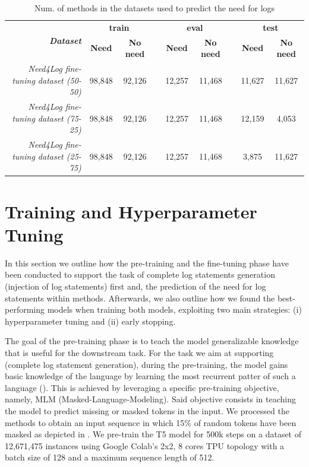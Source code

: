 \begin{table}[h!]
	\centering
	\caption{Num. of methods in the datasets used to predict the need for logs}
	\begin{tabular}{rcccccccc}
		\hline
		\multirow{2}{*}{\textit{\textbf{Dataset}}} & \multicolumn{2}{c}{\textbf{train}} & \textbf{} & \multicolumn{2}{c}{\textbf{eval}}  & \textbf{} & \multicolumn{2}{c}{\textbf{test}}  \\ \cline{2-3} \cline{5-6} \cline{8-9} 
		& \textbf{Need} & \textbf{No need}   & \textbf{} & \textbf{Need} & \textbf{No need}   & \textbf{} & \textbf{Need} & \textbf{No need}   \\ \hline
		\textit{Need4Log fine-tuning dataset (50-50)}         & 98,848        & 92,126             &           & 12,257        & 11,468             &           & 11,627        &  11,627            \\
		\textit{Need4Log fine-tuning dataset (75-25)}         & 98,848        & 92,126             &           & 12,257        & 11,468             &           & 12,159        &  4,053             \\
		\textit{Need4Log fine-tuning dataset (25-75)}         & 98,848        & 92,126             &           & 12,257        & 11,468             &           & 3,875         &  11,627            \\ \hline
	\end{tabular}
	\label{tab:ds-summary-2}
\end{table}

\section{Training and Hyperparameter Tuning} \label{sec:training}
In this section we outline how the pre-training and the fine-tuning phase have been conducted to support the task of complete log statements generation (\ie injection of log statements) first and, the prediction of the need for log statements within \java methods. Afterwards, we also outline how we found the best-performing models when training both models, exploiting two main strategies: (i) hyperparameter tuning  and (ii) early stopping.

The goal of the pre-training phase is to teach the model generalizable knowledge that is useful for the downstream task. For the task we aim at supporting (\ie complete log statement generation), during the pre-training, the model gains basic knowledge of the \java language by learning the most recurrent patter of such a language (\ie \java). This is achieved by leveraging a specific pre-training objective, namely, MLM (Masked-Language-Modeling). Said objective consists in teaching the model to predict missing or masked tokens in the input. We processed the methods to obtain an input sequence in which 15\% of random tokens have been masked as depicted in .
We pre-train the T5 model for 500k steps on a dataset of 12,671,475 instances using Google Colab's 2x2, 8 cores TPU topology with a batch size of 128 and a maximum sequence length of 512.




